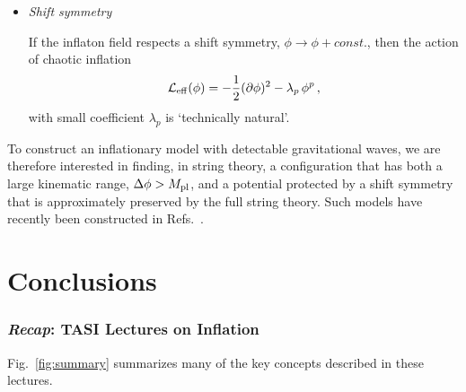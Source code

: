 \documentclass[12pt,letterpaper,rotate]{article}
\def\beq{\begin{equation}}
\def\eeq{\end{equation}}
\def\Mp{M_{\rm pl}}
\begin{document}
{\begin{itemize}
\begin{itemize}
In the absence of any special symmetries, the potential in large-field inflation becomes sensitive to an infinite series of Planck-suppressed operators
\beq
{\cal L}_{\rm eff}(\phi) = -\frac{1}{2}(\partial \phi)^2 - \frac{1}{2} m^2 \phi^2 - \frac{1}{4} \lambda \phi^4 - \sum_{p=1}^\infty \left[ \lambda_p \phi^4  + \nu_p (\partial \phi)^2    \right] \left( \frac{\phi}{M_{\rm pl}} \right)^{2p}+ \cdots \ . \nonumber
\eeq
In this case, the flatness of the potential over a super-Planckian range requires a fine-tuning of a large number of expansion parameters $\lambda_p$
(compared to the eta problem which only requires tuning of one mass parameter).

\item {\it Shift symmetry}

If the inflaton field respects a shift symmetry, $\phi \to \phi + const.$, then
 the action of chaotic inflation 
 \beq
 {\cal L}_{\rm eff}(\phi) =- \frac{1}{2} (\partial \phi)^2 - \lambda_p\, \phi^p\, , \nonumber
 \eeq
with small coefficient $\lambda_p$ is `technically natural'. 
\end{itemize}
To construct  an inflationary model with detectable gravitational waves, we are therefore interested in finding, in string theory, a configuration that has both a large kinematic range, $\Delta \phi > \Mp$, and a potential protected by a shift symmetry that is approximately preserved by the full string theory.
Such models have recently been constructed in Refs.~\cite{Silverstein:2008sg, MSW, Flauger:2009ab}.
\end{itemize}





\newpage
\part{Conclusions}


\section{{\sl Recap}: TASI Lectures on Inflation}


Fig.~\ref{fig:summary} summarizes many of the key concepts described in these lectures.

}
\end{document}
